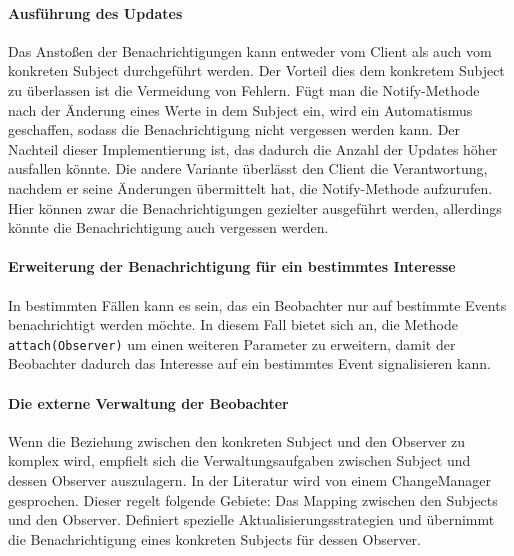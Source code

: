 \paragraph{Ausführung des Updates} Das Anstoßen der Benachrichtigungen kann entweder vom Client als auch vom konkreten Subject durchgeführt werden. Der Vorteil dies dem konkretem Subject zu überlassen ist die Vermeidung von Fehlern. Fügt man die Notify-Methode nach der Änderung eines Werte in dem Subject ein, wird ein Automatismus geschaffen, sodass die Benachrichtigung nicht vergessen werden kann. Der Nachteil dieser Implementierung ist, das dadurch die Anzahl der Updates höher ausfallen könnte. Die andere Variante überlässt den Client die Verantwortung, nachdem er seine Änderungen übermittelt hat, die Notify-Methode aufzurufen. Hier können zwar die Benachrichtigungen gezielter ausgeführt werden, allerdings könnte die Benachrichtigung auch vergessen werden.



\paragraph{Erweiterung der Benachrichtigung für ein bestimmtes Interesse} In bestimmten Fällen kann es sein, das ein Beobachter nur auf bestimmte Events benachrichtigt werden möchte. In diesem Fall bietet sich an,  die Methode \texttt{attach(Observer)} um einen weiteren Parameter zu erweitern, damit der Beobachter dadurch das Interesse auf ein bestimmtes Event signalisieren kann.

\paragraph{Die externe Verwaltung der Beobachter} Wenn die Beziehung zwischen den konkreten Subject und den Observer zu komplex wird, empfielt sich die Verwaltungsaufgaben zwischen Subject und dessen Observer auszulagern. In der Literatur wird von einem ChangeManager gesprochen. Dieser regelt folgende Gebiete: Das Mapping zwischen den Subjects und den Observer. Definiert spezielle Aktualisierungsstrategien und übernimmt die Benachrichtigung eines konkreten Subjects für dessen Observer.

